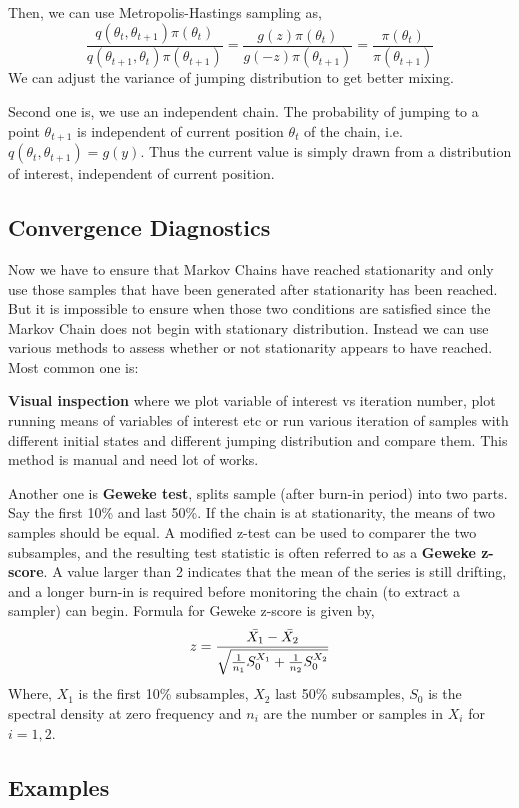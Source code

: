 Then, we can use Metropolis-Hastings sampling as,
\[
	\frac{q(\theta_t,\theta_{t+1})\pi(\theta_t)}{q(\theta_{t+1},\theta_{t})\pi(\theta_{t+1})}  = \frac{g(z)\pi(\theta_t)}{g(-z)\pi(\theta_{t+1})} = \frac{\pi(\theta_t)}{\pi(\theta_{t+1})}
\]
We can adjust the variance of jumping distribution to get better mixing.

Second one is, we use an independent chain. The probability of jumping to a point $ \theta_{t+1} $ is independent of current position $ \theta_t $ of the chain, i.e. $ q(\theta_t,\theta_{t+1}) = g(y) $. Thus the current value is simply drawn from a distribution of interest, independent of current position.

\subsection{Convergence Diagnostics}
Now we have to ensure that Markov Chains have reached stationarity and only use those samples that have been generated after stationarity has been reached. But it is impossible to ensure when those two conditions are satisfied since the Markov Chain does not begin with stationary distribution. Instead we can use various methods to assess whether or not stationarity appears to have reached. Most common one is:

\textbf{Visual inspection} where we plot variable of interest vs iteration number, plot running means of variables of interest etc or run various iteration of samples with different initial states and different jumping distribution and compare them. This method is manual and need lot of works.

Another one is \textbf{Geweke test}, splits sample (after burn-in period) into two parts.
Say the first 10\% and last 50\%. If the chain is at stationarity, the means of two samples should be equal. A modified z-test can be used to comparer the two subsamples,
and the resulting test statistic is often referred to as a \textbf{Geweke z-score}.
A value larger than 2 indicates that the mean of
the series is still drifting, and a longer burn-in is required before monitoring the
chain (to extract a sampler) can begin. Formula for Geweke z-score is given by,
\[
	z = \frac{\Bar{X_1} - \Bar{X_2}}{\sqrt{ \frac{ 1 }{ n_1 }S^{X_1}_0 + \frac{ 1 }{ n_2 }S^{X_2}_0 }}
\]
Where, $ X_1 $ is the first 10\% subsamples, $ X_2 $ last 50\% subsamples, $ S_0 $ is the spectral density at zero frequency and $ n_i $ are the number or samples in $ X_i $ for $ i = 1,2 $.

\subsection{Examples}

